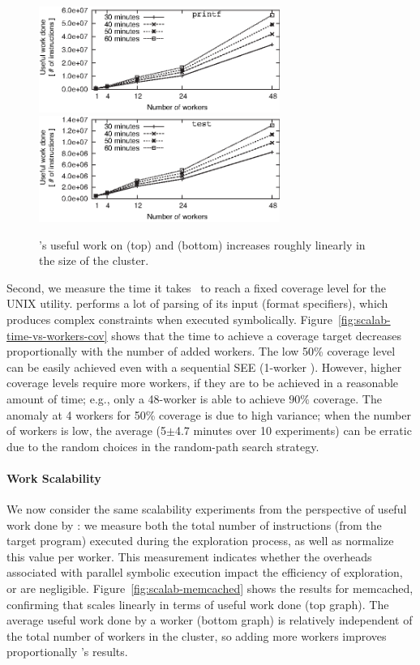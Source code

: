 \begin{figure}
  \centering
\includegraphics[width=0.7\textwidth]{evaluation/graphs/cloud9/scalab-thr-cpu-vs-workers-edited} \\
\includegraphics[width=0.7\textwidth]{evaluation/graphs/cloud9/scalab-thr-cpu-vs-workers-test-edited}
  \caption{\cnine's useful work on  (top) and  (bottom) increases roughly linearly in the size of the cluster.}
  \label{fig:scalab}
\end{figure}

Second, we measure the time it takes \cnine\ to reach a fixed coverage level for the  UNIX utility.   performs a lot of parsing of its input (format specifiers), which produces complex constraints when executed symbolically.   Figure~\ref{fig:scalab-time-vs-workers-cov} shows that the time to achieve a coverage target decreases proportionally with the number of added workers.  The low 50\% coverage level can be easily achieved even with a sequential SEE (1-worker \cnine). However, higher coverage levels require more workers, if they are to be achieved in a reasonable amount of time; e.g., only a 48-worker \cnine is able to achieve  $90\%$ coverage.  The anomaly at 4 workers for 50\% coverage is due to high variance; when the number of workers is low, the average (5$\pm$4.7 minutes over 10 experiments) can be erratic due to the random choices in the random-path search strategy.

\paragraph{Work Scalability} We now consider the same scalability experiments from the perspective of useful work done by \cnine: we measure both the total number of instructions (from the target program) executed during the exploration process, as well as normalize this value per worker. This measurement indicates whether the overheads associated with parallel symbolic execution impact the efficiency of exploration, or are negligible. Figure~\ref{fig:scalab-memcached} shows the results for memcached, confirming that \cnine scales linearly in terms of useful work done (top graph).  The average useful work done by a worker (bottom graph) is relatively independent of the total number of workers in the cluster, so adding more workers improves proportionally \cnine's results.

